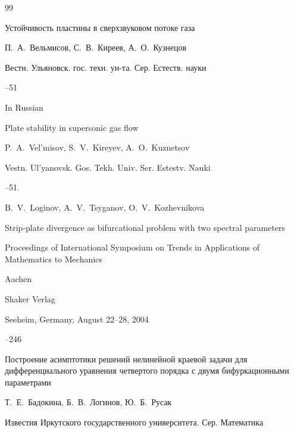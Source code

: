 \begin{thebibliography}{99}

\paper Устойчивость пластины в сверхзвуковом потоке газа

\by  П.~А.~Вельмисов, С.~В.~Киреев, А.~О.~Кузнецов

\jour Вестн. Ульяновск. гос. техн. ун-та. Сер. Естеств. науки




--51 

\misctransl

\lang In Russian

\paper Plate stability in supersonic gas flow

\by P.~A.~Vel'misov, S.~V.~Kireyev, A.~O.~Kuznetsov

\jour Vestn. Ul'yanovsk. Gos. Tekh. Univ. Ser. Estestv. Nauki



--51.




\by B.~V.~Loginov,  A.~V.~Tsyganov, O.~V.~Kozhevnikova

\paper Strip-plate divergence as bifurcational problem with two spectral parameters

\inbook Proceedings of International Symposium on Trends in Applications of Mathematics to Mechanics


\publaddr Aachen

\publ Shaker Verlag

\procinfo Seeheim, Germany, August 22--28, 2004

--246









\paper Построение асимптотики решений нелинейной краевой задачи для дифференциального уравнения четвертого порядка с двумя бифуркационными параметрами

\by  Т.~Е.~Бадокина, Б.~В.~Логинов, Ю.~Б.~Русак

\jour Известия Иркутского государственного университета. Сер. Математика


\end{thebibliography}
